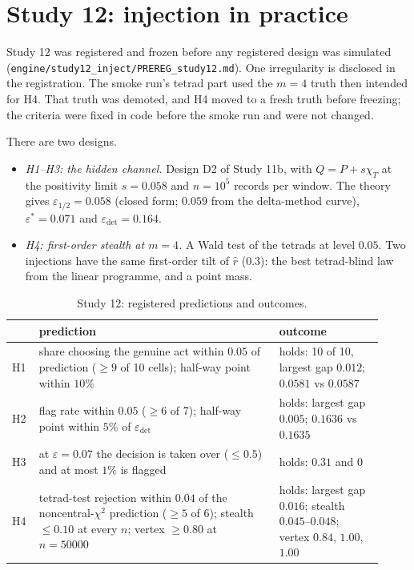 \documentclass[11pt]{article}
\theoremstyle{definition}\newtheorem{definition}{Definition}\newtheorem{remark}{Remark}
\begin{document}
\section{Study 12: injection in practice}\label{sec:study12}
Study 12 was registered and frozen before any registered design was simulated
(\texttt{engine/\allowbreak study12\_inject/\allowbreak PREREG\_study12.md}).
One irregularity is disclosed in the registration. The smoke run's tetrad part used the $m=4$ truth then intended for H4. That truth was
demoted, and H4 moved to a fresh truth before freezing; the criteria were fixed in code before the smoke run and were not changed.

There are two designs.
\begin{itemize}
\item \emph{H1--H3: the hidden channel.} Design D2 of Study 11b, with $Q=P+s\chi_T$ at the positivity limit $s=0.058$ and
  $n=10^5$ records per window. The theory gives $\varepsilon_{1/2}=0.058$ (closed form; $0.059$ from the delta-method curve),
  $\varepsilon^*=0.071$ and $\varepsilon_{\det}=0.164$.
\item \emph{H4: first-order stealth at $m=4$.} A Wald test of the tetrads at level $0.05$. Two injections have the same first-order
  tilt of $\hat r$ ($0.3$): the best tetrad-blind law from the linear programme, and a point mass.
\end{itemize}

\begin{table}[!htbp]\centering\small
\begin{tabular}{p{0.06\linewidth}p{0.6\linewidth}p{0.26\linewidth}}\toprule
& prediction & outcome\\\midrule
H1 & share choosing the genuine act within $0.05$ of prediction ($\ge9$ of 10 cells); half-way point within $10\%$ & holds: 10 of 10, largest gap $0.012$; $0.0581$ vs $0.0587$\\
H2 & flag rate within $0.05$ ($\ge6$ of 7); half-way point within $5\%$ of $\varepsilon_{\det}$ & holds: largest gap $0.005$; $0.1636$ vs $0.1635$\\
H3 & at $\varepsilon=0.07$ the decision is taken over ($\le0.5$) and at most $1\%$ is flagged & holds: $0.31$ and $0$\\
H4 & tetrad-test rejection within $0.04$ of the noncentral-$\chi^2$ prediction ($\ge5$ of 6); stealth $\le0.10$ at every $n$; vertex $\ge0.80$ at $n=50000$ & holds: largest gap $0.016$; stealth $0.045$--$0.048$; vertex $0.84$, $1.00$, $1.00$\\\bottomrule
\end{tabular}
\caption{Study 12: registered predictions and outcomes.}\label{tab:study12}
\end{table}
\end{document}
